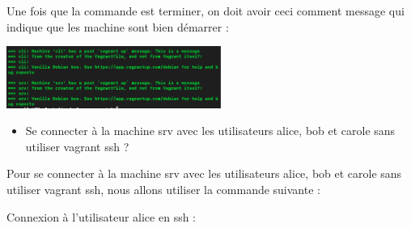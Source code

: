 \documentclass[12pt]{article}
\begin{document}
\vspace{0.3cm}

Une fois que la commande est terminer, on doit avoir ceci comment message qui indique que les machine sont bien démarrer : 

\vspace{0.3cm}

\begin{center}
  \includegraphics[width=7cm]{Image-TD-SSH-1/Machine.png}
\end{center}

\vspace{0.3cm}

\begin{itemize}
  \item Se connecter à la machine srv avec les utilisateurs alice, bob et carole sans utiliser vagrant ssh ?
\end{itemize}

\vspace{0.3cm}

Pour se connecter à la machine srv avec les utilisateurs alice, bob et carole sans utiliser vagrant ssh, nous allons utiliser la commande suivante : 

\vspace{0.3cm}

Connexion à l'utilisateur alice en ssh  : 

\vspace{0.3cm}
\end{document}
